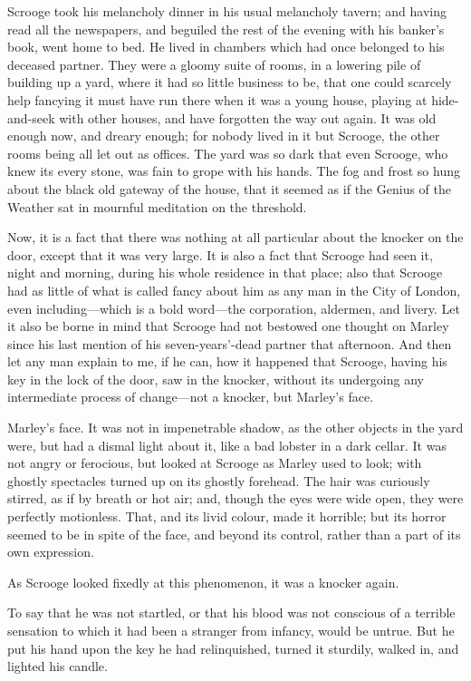 \documentclass[paper=5.5in:8.5in,BCOR=15mm,twoside,DIV=15,headinclude=off,12pt,chapterprefix=off,openany,headings=huge]{scrbook} %
\begin{document}
Scrooge took his melancholy dinner in his usual melancholy tavern; and having read all the newspapers, and beguiled the rest of the evening with his banker's book, went home to bed. He lived in chambers which had once belonged to his deceased partner. They were a gloomy suite of rooms, in a lowering pile of building up a yard, where it had so little business to be, that one could scarcely help fancying it must have run there when it was a young house, playing at hide-and-seek with other houses, and have forgotten the way out again. It was old enough now, and dreary enough; for nobody lived in it but Scrooge, the other rooms being all let out as offices. The yard was so dark that even Scrooge, who knew its every stone, was fain to grope with his hands. The fog and frost so hung about the black old gateway of the house, that it seemed as if the Genius of the Weather sat in mournful meditation on the threshold.

Now, it is a fact that there was nothing at all particular about the knocker on the door, except that it was very large. It is also a fact that Scrooge had seen it, night and morning, during his whole residence in that place; also that Scrooge had as little of what is called fancy about him as any man in the City of London, even including—which is a bold word—the corporation, aldermen, and livery. Let it also be borne in mind that Scrooge had not bestowed one thought on Marley since his last mention of his seven-years'-dead partner that afternoon. And then let any man explain to me, if he can, how it happened that Scrooge, having his key in the lock of the door, saw in the knocker, without its undergoing any intermediate process of change—not a knocker, but Marley's face.

Marley's face. It was not in impenetrable shadow, as the other objects in the yard were, but had a dismal light about it, like a bad lobster in a dark cellar. It was not angry or ferocious, but looked at Scrooge as Marley used to look; with ghostly spectacles turned up on its ghostly forehead. The hair was curiously stirred, as if by breath or hot air; and, though the eyes were wide open, they were perfectly motionless. That, and its livid colour, made it horrible; but its horror seemed to be in spite of the face, and beyond its control, rather than a part of its own expression.

As Scrooge looked fixedly at this phenomenon, it was a knocker again.

To say that he was not startled, or that his blood was not conscious of a terrible sensation to which it had been a stranger from infancy, would be untrue. But he put his hand upon the key he had relinquished, turned it sturdily, walked in, and lighted his candle.
\end{document}
